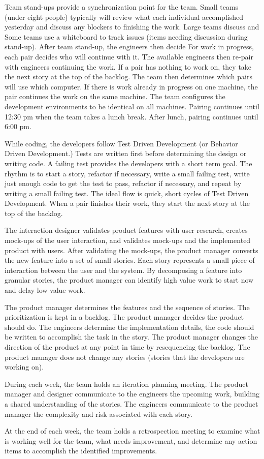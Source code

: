 Team stand-ups provide a synchronization point for the team. Small teams (under eight people) typically will review what each individual accomplished yesterday and discuss any blockers to finishing the work. Large teams discuss  and  Some teams use a whiteboard to track  issues (items needing discussion during stand-up). After team stand-up, the engineers then decide  For work in progress, each pair decides who will continue with it. The available engineers then re-pair with engineers continuing the work. If a pair has nothing to work on, they take the next story at the top of the backlog. The team then determines which pairs will use which computer. If there is work already in progress on one machine, the pair continues the work on the same machine. The team configures the development environments to be identical on all machines. Pairing continues until 12:30 pm when the team takes a lunch break. After lunch, pairing continues until 6:00 pm. 

While coding, the developers follow Test Driven Development (or Behavior Driven Development.) Tests are written first before determining the design or writing code. A failing test provides the developers with a short term goal. The rhythm is to start a story, refactor if necessary, write a small failing test, write just enough code to get the test to pass, refactor if necessary, and repeat by writing a small failing test. The ideal flow is quick, short cycles of Test Driven Development. When a pair finishes their work, they start the next story at the top of the backlog. 

The interaction designer validates product features with user research, creates mock-ups of the user interaction, and validates mock-ups and the implemented product with users. After validating the mock-ups, the product manager converts the new feature into a set of small stories. Each story represents a small piece of interaction between the user and the system. By decomposing a feature into granular stories, the product manager can identify high value work to start now and delay low value work.  

The product manager determines the features and the sequence of stories. The prioritization is kept in a backlog. The product manager decides  the product should do. The engineers determine the implementation details,  the code should be written to accomplish the task in the story. The product manager changes the direction of the product at any point in time by resequencing the backlog. The product manager does not change any  stories (stories that the developers are working on).

During each week, the team holds an iteration planning meeting. The product manager and designer communicate to the engineers the upcoming work, building a shared understanding of the stories. The engineers communicate to the product manager the complexity and risk associated with each story.

At the end of each week, the team holds a retrospection meeting to examine what is working well for the team, what needs improvement, and determine any action items to accomplish the identified improvements.



